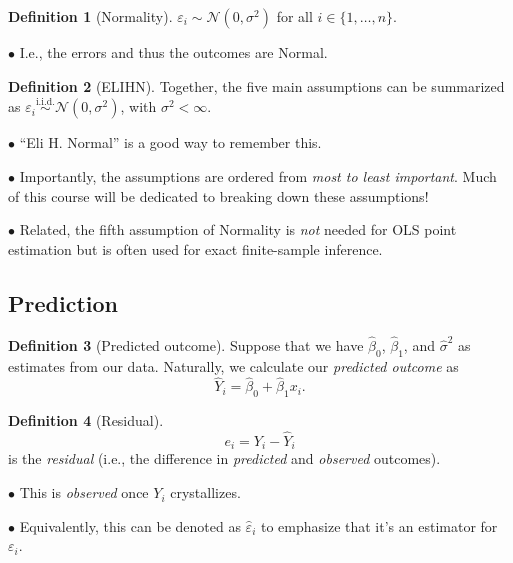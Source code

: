 \documentclass[12pt,oneside]{article}
\newcommand{\N}{\mathcal{N}}
\newcommand{\simiid}{\overset{\text{i.i.d.}}{\sim}}
\theoremstyle{definition}
\newtheorem{definition}{Definition}
\newtheorem{concept}{\faPen \ Concept Checker}
\theoremstyle{remark}
\begin{document}
\begin{definition}[Normality]
$\varepsilon_i \sim \N(0, \sigma^2)$ for all $i \in \{1, \ldots, n\}$.

$\bullet$ I.e., the errors and thus the outcomes are Normal.
\end{definition}

\begin{definition}[ELIHN]
Together, the five main assumptions can be summarized as $\varepsilon_i \simiid \N(0, \sigma^2)$, with $\sigma^2 < \infty$.

$\bullet$ \enquote{Eli H. Normal} is a good way to remember this.

$\bullet$ Importantly, the assumptions are ordered from \textit{most to least important}. Much of this course will be dedicated to breaking down these assumptions!

$\bullet$ Related, the fifth assumption of Normality is \textit{not} needed for OLS point estimation but is often used for exact finite-sample inference.
\end{definition}



\subsection{Prediction}

\begin{definition}[Predicted outcome]
Suppose that we have $\hat{\beta}_0$, $\hat{\beta}_1$, and $\hat{\sigma}^2$ as estimates from our data. Naturally, we calculate our \textit{predicted outcome} as \[\hat{Y}_i = \hat{\beta}_0 + \hat{\beta}_1 x_i.\]
\end{definition}

\begin{definition}[Residual]
\[e_i = Y_i - \hat{Y}_i\] is the \textit{residual} (i.e., the difference in \textit{predicted} and \textit{observed} outcomes).

$\bullet$ This is \textit{observed} once $Y_i$ crystallizes.

$\bullet$ Equivalently, this can be denoted as $\hat{\varepsilon}_i$ to emphasize that it's an estimator for $\varepsilon_i$.
\end{definition}
\end{document}
